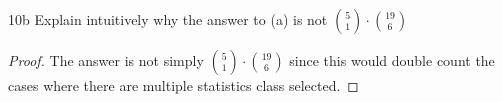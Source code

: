 \begin{exercise}{10b}
    Explain intuitively why the answer to (a) is not ${5 \choose 1} \cdot {19 \choose 6}$
\end{exercise}

\begin{proof}
    The answer is not simply ${5 \choose 1} \cdot {19 \choose 6}$ since this would double count the cases where there are multiple statistics class selected.
\end{proof}



